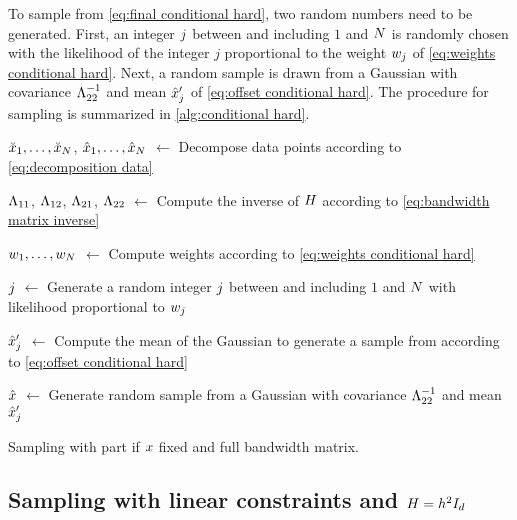 To sample from \cref{eq:final conditional hard}, two random numbers need to be generated. 
First, an integer $j$ between and including $1$ and $N$ is randomly chosen with the likelihood of the integer $j$ proportional to the weight $w_{j}$ of \cref{eq:weights conditional hard}. 
Next, a random sample is drawn from a Gaussian with covariance $\Lambda_{22}^{-1}$ and mean $\hat{x}_{j}'$ of \cref{eq:offset conditional hard}.
The procedure for sampling is summarized in \cref{alg:conditional hard}.


\begin{algorithm}[t]
	
	$\breve{x}_{1},\ldots,\breve{x}_{N}$, $\hat{x}_{1},\ldots,\hat{x}_{N}$ $\gets$ Decompose data points according to \cref{eq:decomposition data}
	
	$\Lambda_{11}$, $\Lambda_{12}$, $\Lambda_{21}$, $\Lambda_{22}$ $\gets$ Compute the inverse of $H$ according to \cref{eq:bandwidth matrix inverse}
	
	$w_{1},\ldots,w_{N}$ $\gets$ Compute weights according to \cref{eq:weights conditional hard}
	
	$j$ $\gets$ Generate a random integer $j$ between and including $1$ and $N$ with likelihood proportional to $w_{j}$
	
	$\hat{x}_{j}'$ $\gets$ Compute the mean of the Gaussian to generate a sample from according to \cref{eq:offset conditional hard}
	
	$\hat{x}$ $\gets$ Generate random sample from a Gaussian with covariance $\Lambda_{22}^{-1}$ and mean $\hat{x}_{j}'$
		
	\caption{Sampling with part if $x$ fixed and full bandwidth matrix.}
	\label{alg:conditional hard}
\end{algorithm}



\subsection{Sampling with linear constraints and $H=h^2I_{d}$}
\label{sec:sampling constrained simple}

